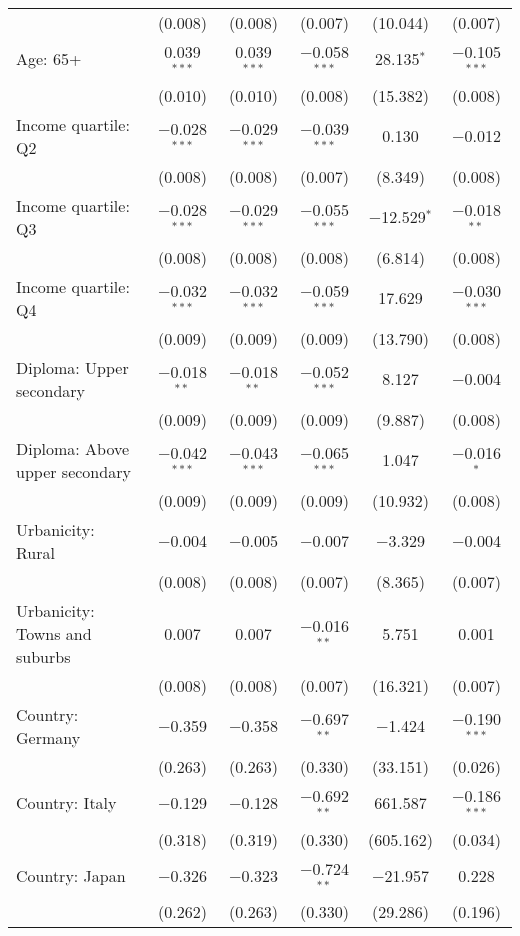 \begin{tabular}{@{\extracolsep{5pt}}lccccc}
  & (0.008) & (0.008) & (0.007) & (10.044) & (0.007) \\ 
  Age: 65+ & 0.039$^{***}$ & 0.039$^{***}$ & $-$0.058$^{***}$ & 28.135$^{*}$ & $-$0.105$^{***}$ \\ 
  & (0.010) & (0.010) & (0.008) & (15.382) & (0.008) \\ 
  Income quartile: Q2 & $-$0.028$^{***}$ & $-$0.029$^{***}$ & $-$0.039$^{***}$ & 0.130 & $-$0.012 \\ 
  & (0.008) & (0.008) & (0.007) & (8.349) & (0.008) \\ 
  Income quartile: Q3 & $-$0.028$^{***}$ & $-$0.029$^{***}$ & $-$0.055$^{***}$ & $-$12.529$^{*}$ & $-$0.018$^{**}$ \\ 
  & (0.008) & (0.008) & (0.008) & (6.814) & (0.008) \\ 
  Income quartile: Q4 & $-$0.032$^{***}$ & $-$0.032$^{***}$ & $-$0.059$^{***}$ & 17.629 & $-$0.030$^{***}$ \\ 
  & (0.009) & (0.009) & (0.009) & (13.790) & (0.008) \\ 
  Diploma: Upper secondary & $-$0.018$^{**}$ & $-$0.018$^{**}$ & $-$0.052$^{***}$ & 8.127 & $-$0.004 \\ 
  & (0.009) & (0.009) & (0.009) & (9.887) & (0.008) \\ 
  Diploma: Above upper secondary & $-$0.042$^{***}$ & $-$0.043$^{***}$ & $-$0.065$^{***}$ & 1.047 & $-$0.016$^{*}$ \\ 
  & (0.009) & (0.009) & (0.009) & (10.932) & (0.008) \\ 
  Urbanicity: Rural & $-$0.004 & $-$0.005 & $-$0.007 & $-$3.329 & $-$0.004 \\ 
  & (0.008) & (0.008) & (0.007) & (8.365) & (0.007) \\ 
  Urbanicity: Towns and suburbs & 0.007 & 0.007 & $-$0.016$^{**}$ & 5.751 & 0.001 \\ 
  & (0.008) & (0.008) & (0.007) & (16.321) & (0.007) \\ 
  Country: Germany & $-$0.359 & $-$0.358 & $-$0.697$^{**}$ & $-$1.424 & $-$0.190$^{***}$ \\ 
  & (0.263) & (0.263) & (0.330) & (33.151) & (0.026) \\ 
  Country: Italy & $-$0.129 & $-$0.128 & $-$0.692$^{**}$ & 661.587 & $-$0.186$^{***}$ \\ 
  & (0.318) & (0.319) & (0.330) & (605.162) & (0.034) \\ 
  Country: Japan & $-$0.326 & $-$0.323 & $-$0.724$^{**}$ & $-$21.957 & 0.228 \\ 
  & (0.262) & (0.263) & (0.330) & (29.286) & (0.196) \\ 

\end{tabular}
